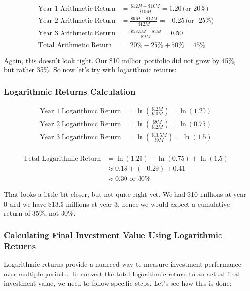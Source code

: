 \documentclass{article}
\begin{document}
\begin{align*}
    \text{Year 1 Arithmetic Return} &= \frac{\$12M - \$10M}{\$10M} = 0.20 \, \text{(or 20\%)} \\
    \text{Year 2 Arithmetic Return} &= \frac{\$9M - \$12M}{\$12M} = -0.25 \, \text{(or -25\%)} \\
    \text{Year 3 Arithmetic Return} &= \frac{\$13.5M - \$9M}{\$9M} = 0.50 \\
    \text{Total Arithmetic Return} &= 20\% - 25\% + 50\% = 45\%
\end{align*}

Again, this doesn't look right. Our \$10 million portfolio did not grow by 45\%, but rather 35\%. So now let's try with logarithmic returns:

\subsubsection{Logarithmic Returns Calculation}

\begin{align*}
    \text{Year 1 Logarithmic Return} &= \ln\left(\frac{\$12M}{\$10M}\right) = \ln(1.20) \\
    \text{Year 2 Logarithmic Return} &= \ln\left(\frac{\$9M}{\$12M}\right) = \ln(0.75) \\
    \text{Year 3 Logarithmic Return} &= \ln\left(\frac{\$13.5M}{\$9M}\right) = \ln(1.5) \\
\end{align*}

\begin{align*}
    \text{Total Logarithmic Return} &= \ln(1.20) + \ln(0.75) + \ln(1.5) \\
                                    &\approx 0.18 + (-0.29) + 0.41 \\
                                    &\approx 0.30 \text{ or } 30\%
\end{align*}

That looks a little bit closer, but not quite right yet. We had \$10 millions at year 0 and we have \$13.5 millions at year 3, hence we would expect a cumulative return of 35\%, not 30\%. 

\subsubsection{Calculating Final Investment Value Using Logarithmic Returns}

Logarithmic returns provide a nuanced way to measure investment performance over multiple periods. To convert the total logarithmic return to an actual final investment value, we need to follow specific steps. Let's see how this is done: \\
\end{document}

